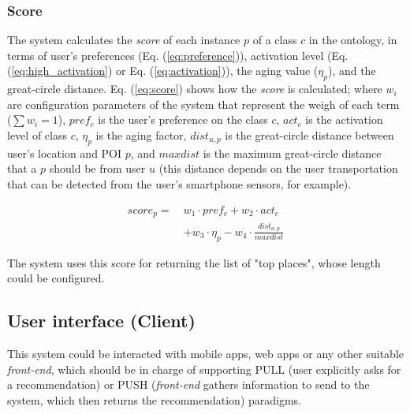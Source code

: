 \subsubsection{\bf Score} \label{section:score}
The system calculates the \textit{score} of each instance $p$ of a class $c$ in  the ontology, in terms of user's preferences (Eq. (\ref{eq:preference})), activation level (Eq. (\ref{eq:high_activation}) or Eq. (\ref{eq:activation})), the aging value ($\eta_p$), and the great-circle distance. Eq. (\ref{eq:score}) shows how the \textit{score} is calculated; where $w_i$ are configuration parameters of the system that represent the weigh of each term ($\sum w_i =1$), $pref_c$ is the user's preference on the class $c$, $act_c$ is the activation level of class $c$, $\eta_p$ is the aging factor, $dist_{u,p}$ is the great-circle distance between user's location and POI $p$, and $maxdist$ is the maximum great-circle distance that a $p$ should be from user $u$  (this distance depends on the user transportation that can be detected  from the user's smartphone sensors, for example).


\begin{equation} \label{eq:score}
    \begin{split}
score_p =   \ &w_1 \cdot pref_c + w_2 \cdot act_c \\
                                        &+ w_3 \cdot \eta_p - w_4 \cdot \frac{dist_{u,p}}{maxdist}
    \end{split}
\end{equation}

The system uses this score for returning the list of "top places", whose length could be configured.

\subsection{User interface (Client)}
This system could be interacted with mobile apps, web apps or any other suitable \textit{front-end}, which should be in charge of supporting PULL (user explicitly asks for a recommendation) or PUSH (\textit{front-end} gathers information to send to the system, which then returns the recommendation) paradigms.



